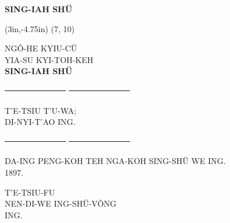 \begin{titlepage}
	\vspace*{18ex}
	\begin{center}
		{\huge\bfseries\MakeUppercase{Sing-Iah Shü}}
	\end{center}
	
	\clearpage
	
	\thisfancyput(3in,-4.75in){
		\setlength{\unitlength}{1in}
		\oval(7, 10)
	}
	
	\begin{center}
		\MakeUppercase{
			{\Large ngô-he kyiu-cü}			\\[6.5ex]
			{\LARGE yia-su kyi-toh-keh}			\\[7.5ex]
			{\huge\bfseries Sing-Iah Shü}		\\
		}
		
		\vfill
		{\Large \sout{~~~~~~~~~~~~~~~}  \sout{~~~~~~~~~~~~~~~}}
		\vfill
		
		\MakeUppercase{
			{\LARGE t'e-tsiu t'u-wa;}			\\[6ex]
			{\large di-nyi-t'ao ing.}			\\
		}
		
		\vfill
		{\Large \sout{~~~~~~~~~~~~~~~}  \sout{~~~~~~~~~~~~~~~}}
		\vfill
		
		\MakeUppercase{
			{\large da-ing peng-koh teh nga-koh sing-shü we ing. \\[2ex]
					1897.
			}	
		}
	\end{center}
	
	\clearpage
	
	\vspace*{\fill}
	\begin{center}
		\MakeUppercase{
			t'e-tsiu-fu \\
			nen-di-we ing-shü-vông \\
			ing.
		}
	\end{center}
	\vspace*{\fill}
	
\end{titlepage}